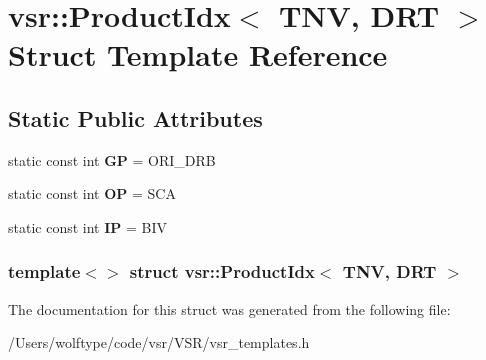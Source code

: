 \hypertarget{structvsr_1_1_product_idx_3_01_t_n_v_00_01_d_r_t_01_4}{\section{vsr\-:\-:Product\-Idx$<$ T\-N\-V, D\-R\-T $>$ Struct Template Reference}
\label{structvsr_1_1_product_idx_3_01_t_n_v_00_01_d_r_t_01_4}
}
\subsection*{Static Public Attributes}
\begin{DoxyCompactItemize}
\item 
\hypertarget{structvsr_1_1_product_idx_3_01_t_n_v_00_01_d_r_t_01_4_aa4f72c87b404dfb8b4535991b30439d5}{static const int {\bfseries G\-P} = O\-R\-I\-\_\-\-D\-R\-B}\label{structvsr_1_1_product_idx_3_01_t_n_v_00_01_d_r_t_01_4_aa4f72c87b404dfb8b4535991b30439d5}

\item 
\hypertarget{structvsr_1_1_product_idx_3_01_t_n_v_00_01_d_r_t_01_4_a89c51c8505545d45c6430f9aa72fbd27}{static const int {\bfseries O\-P} = S\-C\-A}\label{structvsr_1_1_product_idx_3_01_t_n_v_00_01_d_r_t_01_4_a89c51c8505545d45c6430f9aa72fbd27}

\item 
\hypertarget{structvsr_1_1_product_idx_3_01_t_n_v_00_01_d_r_t_01_4_a01f35a96663616f65ca42d5827f59d3f}{static const int {\bfseries I\-P} = B\-I\-V}\label{structvsr_1_1_product_idx_3_01_t_n_v_00_01_d_r_t_01_4_a01f35a96663616f65ca42d5827f59d3f}

\end{DoxyCompactItemize}
\subsubsection*{template$<$$>$ struct vsr\-::\-Product\-Idx$<$ T\-N\-V, D\-R\-T $>$}



The documentation for this struct was generated from the following file\-:\begin{DoxyCompactItemize}
\item 
/\-Users/wolftype/code/vsr/\-V\-S\-R/vsr\-\_\-templates.\-h\end{DoxyCompactItemize}
